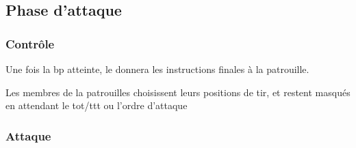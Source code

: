 \subsection{Phase d'attaque}

\subsubsection{Contrôle}

\begin{e1}
	\item Une fois la \gls{bp} atteinte, le \ja{} donnera les instructions finales à la patrouille.
	\item Les membres de la patrouilles choisissent leurs positions de tir, et restent masqués en attendant le \gls{tot}/\gls{ttt} ou l'ordre d'attaque
\end{e1}

\subsubsection{Attaque}

